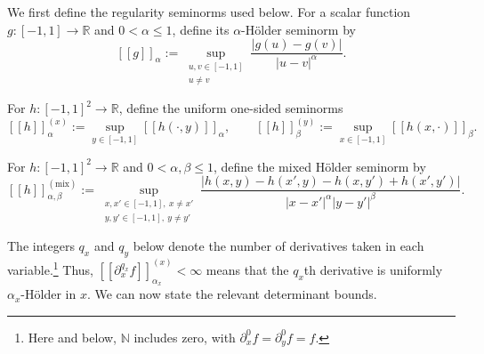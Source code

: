\documentclass[11pt]{article}
\theoremstyle{definition}
\theoremstyle{remark}
\newcommand{\R}{\mathbb{R}}
\newcommand{\abs}[1]{\left\lvert #1\right\rvert}
\newcommand{\seminorm}[1]{\left[\!\left[ #1\right]\!\right]}
\begin{document}
We first define the regularity seminorms used below.
For a scalar function $g:[-1,1]\to\R$ and $0<\alpha\le1$, define its
$\alpha$-H\"older seminorm by
\[
    \seminorm{g}_{\alpha}
    :=
    \sup_{\substack{u,v\in [-1, 1]\\u\ne v}}
    \frac{\abs{g(u)-g(v)}}{\abs{u-v}^{\alpha}}.
\]

For $h:[-1, 1]^2\to\R$, define the uniform one-sided seminorms
\[
    \seminorm{h}_{\alpha}^{(x)}
    :=
    \sup_{y\in [-1, 1]}\seminorm{h(\cdot,y)}_{\alpha},
    \qquad
    \seminorm{h}_{\beta}^{(y)}
    :=
    \sup_{x\in [-1, 1]}\seminorm{h(x,\cdot)}_{\beta}.
\]

For $h:[-1,1]^2\to\R$ and $0<\alpha,\beta\le1$, define the mixed
H\"older seminorm by
\[
    \seminorm{h}_{\alpha,\beta}^{(\mathrm{mix})}
    :=
    \sup_{\substack{x,x'\in [-1, 1],\ x\ne x'\\
                    y,y'\in [-1, 1],\ y\ne y'}}
    \frac{
      \abs{
        h(x,y)-h(x',y)-h(x,y')+h(x',y')
      }
    }{
      \abs{x-x'}^\alpha\abs{y-y'}^\beta
    }.
\]

The integers $q_x$ and $q_y$ below denote the number of derivatives
taken in each variable.\footnote{Here and below, $\mathbb N$ includes
zero, with $\partial_x^0f=\partial_y^0f=f$.}
Thus,
$\seminorm{\partial_x^{q_x}f}_{\alpha_x}^{(x)}<\infty$
means that the $q_x$th derivative is uniformly
$\alpha_x$-H\"older in $x$. We can now state the relevant determinant bounds.
\end{document}
